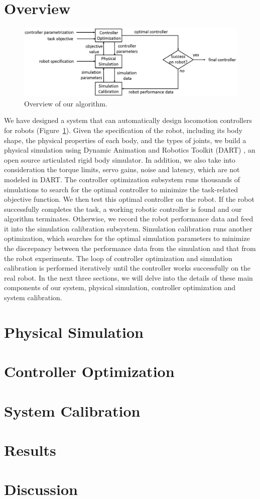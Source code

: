 \section{Overview}

\begin{figure}[!t]
  \centering
  \includegraphics[width=6in]{figures/controllerTransfer}
  \caption{Overview of our algorithm.}
  \label{fig:controllerTransferOverview}
\end{figure}

We have designed a system that can automatically design locomotion controllers for robots (Figure~\ref{fig:controllerTransferOverview}). Given the specification of the robot, including its body shape, the physical properties of each body, and the types of joints, we build a physical simulation using Dynamic Animation and Robotics Toolkit (DART) \cite{dart:2012}, an open source articulated rigid body simulator. In addition, we also take into consideration the torque limits, servo gains, noise and latency, which are not modeled in DART. The controller optimization subsystem runs thousands of simulations to search for the optimal controller to minimize the task-related objective function. We then test this optimal controller on the robot. If the robot successfully completes the task, a working robotic controller is found and our algorithm terminates. Otherwise, we record the robot performance data and feed it into the simulation calibration subsystem. Simulation calibration runs another optimization, which searches for the optimal simulation parameters to minimize the discrepancy between the performance data from the simulation and that from the robot experiments. The loop of controller optimization and simulation calibration is performed iteratively until the controller works successfully on the real robot. In the next three sections, we will delve into the details of these main components of our system, physical simulation, controller optimization and system calibration.

\section{Physical Simulation}
\section{Controller Optimization}
\section{System Calibration}
\section{Results}
\section{Discussion}
